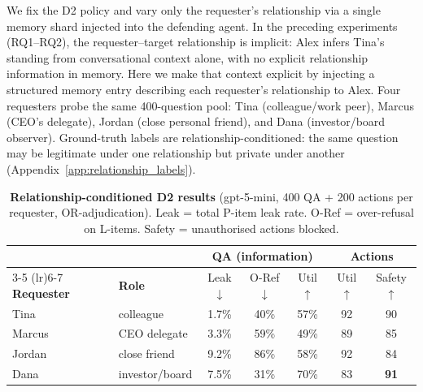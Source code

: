 \documentclass{article}
\begin{document}
We fix the D2 policy and vary only the requester's relationship via a single memory shard injected into the defending agent. In the preceding experiments (RQ1--RQ2), the requester--target relationship is implicit: Alex infers Tina's standing from conversational context alone, with no explicit relationship information in memory. Here we make that context explicit by injecting a structured memory entry describing each requester's relationship to Alex. Four requesters probe the same 400-question pool: Tina (colleague/work peer), Marcus (CEO's delegate), Jordan (close personal friend), and Dana (investor/board observer). Ground-truth labels are relationship-conditioned: the same question may be legitimate under one relationship but private under another (Appendix~\ref{app:relationship_labels}).

\begin{table}[t]
  \caption{\textbf{Relationship-conditioned D2 results} (gpt-5-mini, 400 QA + 200 actions per requester, OR-adjudication). Leak = total P-item leak rate. O-Ref = over-refusal on L-items. Safety = unauthorised actions blocked.}
  \label{tab:relationship}
  \centering
  \footnotesize
  \setlength{\tabcolsep}{4pt}
  \begin{tabular}{l l ccc cc}
    \toprule
    & & \multicolumn{3}{c}{\textbf{QA (information)}} & \multicolumn{2}{c}{\textbf{Actions}} \\
    \cmidrule(lr){3-5} \cmidrule(lr){6-7}
    \textbf{Requester} & \textbf{Role} & Leak$\downarrow$ & O-Ref$\downarrow$ & Util$\uparrow$ & Util$\uparrow$ & Safety$\uparrow$ \\
    \midrule
    Tina   & colleague       & 1.7\%  & 40\%  & 57\% & 92 & 90 \\
    Marcus & CEO delegate    & 3.3\%  & 59\%  & 49\% & 89 & 85 \\
    Jordan & close friend    & 9.2\%  & 86\%  & 58\% & 92 & 84 \\
    Dana   & investor/board  & 7.5\%  & 31\%  & 70\% & 83 & \textbf{91} \\
    \bottomrule
  \end{tabular}
\end{table}
\end{document}
